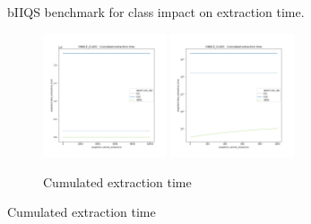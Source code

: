 \begin{figure}
    \caption{bIIQS benchmark for class impact on extraction time.}
    \label{FIG:WORKHORSE_BENCHMARK_05}
\end{figure}


\begin{figure}
    \centering
    \begin{subfigure}[b]{\textwidth}
        \centering
        \includegraphics[width=0.40\textwidth]{./fragments/05_workhorse_experiment/images/01_basebenchmark_04_single_class.png.0_0.png}
        \includegraphics[width=0.40\textwidth]{./fragments/05_workhorse_experiment/images/01_basebenchmark_04_single_class.png.0_1.png}
        \caption{Cumulated extraction time}
        \label{FIG:WORKHORSE_BENCHMARK_04__0_0}
    \end{subfigure}


\end{figure}
